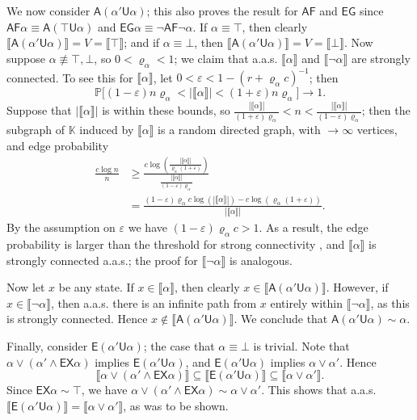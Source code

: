 \documentclass[runngingheads]{llncs}
\newcommand{\sem}[1]{\llbracket #1 \rrbracket}
\begin{document}
We now consider $\mathsf{A}(\alpha'\mathsf{U}\alpha)$; this also proves the result for $\mathsf{AF}$ and $\mathsf{EG}$ since $\mathsf{AF}\alpha \equiv \mathsf{A}(\top\mathsf{U}\alpha)$ and $\mathsf{EG}\alpha \equiv \neg \mathsf{AF}\neg\alpha$. If $\alpha \equiv \top$, then clearly $\sem{\mathsf{A}(\alpha'\mathsf{U}\alpha)} = V = \sem{\top}$; and if $\alpha \equiv \bot$, then $\sem{\mathsf{A}(\alpha'\mathsf{U}\alpha)} = V = \sem{\bot}$. Now suppose $\alpha \not \equiv \top,\bot$, so $0 < \varrho_{\alpha} < 1$; we claim that a.a.s. $\sem{\alpha}$ and $\sem{\neg\alpha}$ are strongly connected. To see this for $\sem{\alpha}$, let $0 < \varepsilon < 1-(r+\varrho_{\alpha}c)^{-1}$; then
\[
\mathbb{P}\Big[(1-\varepsilon)n\varrho_{\alpha} < |\sem{\alpha}| < (1+\varepsilon)n\varrho_{\alpha}\Big] \rightarrow 1.
\]
Suppose that $|\sem{\alpha}|$ is within these bounds, so $\frac{|\sem{\alpha}|}{(1+\varepsilon)\varrho_{\alpha}} < n < \frac{|\sem{\alpha}|}{(1-\varepsilon)\varrho_{\alpha}}$; then the subgraph of $\mathbb{K}$ induced by $\sem{\alpha}$ is a random directed graph, with $\rightarrow \infty$ vertices, and edge probability
\begin{align*}
\frac{c\log n}{n} &\geq \frac{c\log\left(\frac{|\sem{\alpha}|}{\varrho_{\alpha}(1+\varepsilon)}\right)}{\frac{|\sem{\alpha}|}{(1-\varepsilon)\varrho_{\alpha}}}\\
&= \frac{(1-\varepsilon)\varrho_{\alpha}c\log(|\sem{\alpha}|)-c\log(\varrho_{\alpha}(1+\varepsilon))}{|\sem{\alpha}|}.
\end{align*}
By the assumption on $\varepsilon$ we have $(1-\varepsilon)\varrho_{\alpha}c > 1$. As a result, the edge probability is larger than the threshold for strong connectivity \cite{graham2008note}, and $\sem{\alpha}$ is strongly connected a.a.s.; the proof for $\sem{\neg \alpha}$ is analogous. 

Now let $x$ be any state. If $x \in \sem{\alpha}$, then clearly $x \in \sem{\mathsf{A}(\alpha'\mathsf{U}\alpha)}$. However, if $x \in \sem{\neg \alpha}$, then a.a.s. there is an infinite path from $x$ entirely within $\sem{\neg \alpha}$, as this is strongly connected. Hence $x \notin \sem{\mathsf{A}(\alpha'\mathsf{U}\alpha)}$. We conclude that $\mathsf{A}(\alpha'\mathsf{U}\alpha) \sim \alpha$.

Finally, consider $\mathsf{E}(\alpha'\mathsf{U}\alpha)$; the case that $\alpha \equiv \bot$ is trivial. Note that $\alpha \vee (\alpha' \wedge \mathsf{EX}\alpha)$ implies $\mathsf{E}(\alpha'\mathsf{U}\alpha)$, and $\mathsf{E}(\alpha'\mathsf{U}\alpha)$ implies $\alpha \vee \alpha'$. Hence
\[
\sem{\alpha \vee (\alpha' \wedge \mathsf{EX}\alpha)} \subseteq \sem{\mathsf{E}(\alpha'\mathsf{U}\alpha)} \subseteq \sem{\alpha \vee \alpha'}.
\]
Since $\mathsf{EX}\alpha \sim \top$, we have $\alpha \vee (\alpha' \wedge \mathsf{EX}\alpha) \sim \alpha \vee \alpha'$. This shows that a.a.s. $\sem{\mathsf{E}(\alpha'\mathsf{U}\alpha)} = \sem{\alpha \vee \alpha'}$, as was to be shown.
\end{document}
